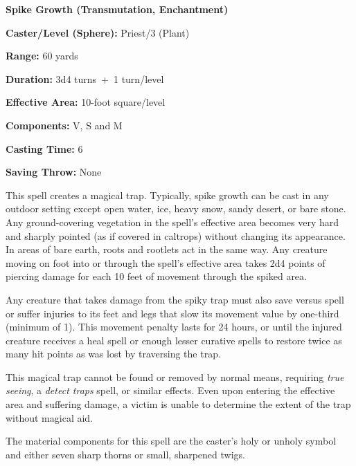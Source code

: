 \begin{multicols}{2}
\vspace{1em}

\noindent
\begin{minipage}{\columnwidth}

\noindent \textbf{Spike Growth (Transmutation, Enchantment)}

\noindent \textbf{Caster/Level (Sphere):} Priest/3 (Plant)

\noindent \textbf{Range:} 60 yards

\noindent \textbf{Duration:} 3d4 turns~+~1 turn/level

\noindent \textbf{Effective Area:} 10-foot square/level

\noindent \textbf{Components:} V, S and M

\noindent \textbf{Casting Time:} 6

\noindent \textbf{Saving Throw:} None

\end{minipage}

This spell creates a magical trap.  Typically, spike growth can be cast in any outdoor setting except open water, ice, heavy snow, sandy desert, or bare stone.  Any ground-covering vegetation in the spell's effective area becomes very hard and sharply pointed (as if covered in caltrops) without changing its appearance.  In areas of bare earth, roots and rootlets act in the same way.  Any creature moving on foot into or through the spell's effective area takes 2d4 points of piercing damage for each 10 feet of movement through the spiked area. 

Any creature that takes damage from the spiky trap must also save versus spell or suffer injuries to its feet and legs that slow its movement value by one-third (minimum of 1).  This movement penalty lasts for 24 hours, or until the injured creature receives a heal spell or enough lesser curative spells to restore twice as many hit points as was lost by traversing the trap. 

This magical trap cannot be found or removed by normal means, requiring \textit{true seeing}, a \textit{detect traps} spell, or similar effects.  Even upon entering the effective area and suffering damage, a victim is unable to determine the extent of the trap without magical aid.
 
The material components for this spell are the caster's holy or unholy symbol and either seven sharp thorns or small, sharpened twigs.

\vspace{1em}


\end{multicols}

